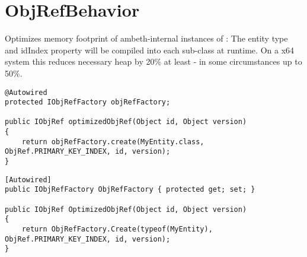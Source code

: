 \section{ObjRefBehavior}
\label{feature:ObjRefBehavior}
\ClearAPI
Optimizes memory footprint of ambeth-internal instances of : The entity type and idIndex property will be compiled into each sub-class at runtime. On a x64 system this reduces necessary heap by 20\% at least - in some circumstances up to 50\%.

\begin{lstlisting}[style=Java,caption={Example usage to receive a memory optimized instance of \type{IObjRef} (Java)}]
@Autowired
protected IObjRefFactory objRefFactory;

public IObjRef optimizedObjRef(Object id, Object version)
{
	return objRefFactory.create(MyEntity.class, ObjRef.PRIMARY_KEY_INDEX, id, version);
}
\end{lstlisting}
\begin{lstlisting}[style=Csharp,caption={Example usage to receive a memory optimized instance of \type{IObjRef} (C\#)}]
[Autowired]
public IObjRefFactory ObjRefFactory { protected get; set; }

public IObjRef OptimizedObjRef(Object id, Object version)
{
	return ObjRefFactory.Create(typeof(MyEntity), ObjRef.PRIMARY_KEY_INDEX, id, version);
}
\end{lstlisting}
